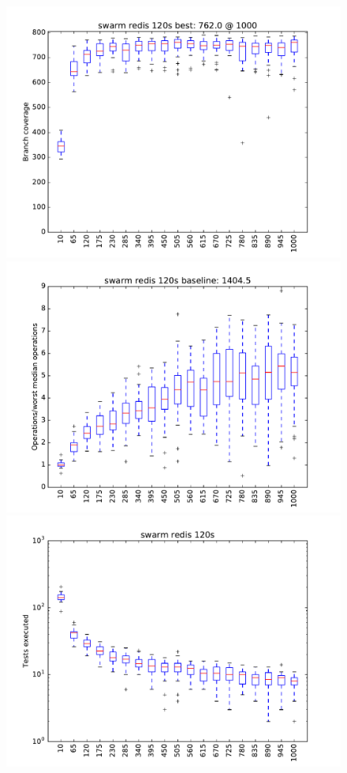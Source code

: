 \begin{figure}
\includegraphics[width=\columnwidth]{graphs/redisswarm120}
\includegraphics[width=\columnwidth]{graphs/opsredisswarm120}
\includegraphics[width=\columnwidth]{graphs/execredisswarm120}
\end{figure}


